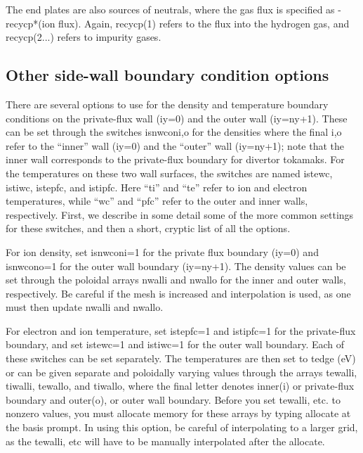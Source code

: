 \documentclass [12pt]{article}
\begin{document}
The end plates are also sources of neutrals, where the gas flux is
specified as -recycp*(ion flux). Again, recycp(1) refers to the flux into
the hydrogen gas, and recycp(2...) refers to impurity gases.


\subsection{Other side-wall boundary condition options}

There are several options to use for the density and temperature boundary
conditions on the private-flux wall (iy=0) and the outer wall (iy=ny+1).
These can be set through the switches {\sf isnwconi,o} for the densities where
the final {\sf i,o} refer to the ``inner'' wall (iy=0) and the ``outer'' wall
(iy=ny+1); note that the inner wall corresponds to the private-flux boundary
for divertor tokamaks.  For the temperatures on these two wall surfaces, the
switches are named {\sf istewc, istiwc, istepfc,} and {\sf istipfc}.  Here
``ti'' and ``te'' refer to ion and electron temperatures, while ``wc'' and
``pfc'' refer to the outer and inner walls, respectively.  First, we describe
in some detail some of the more common settings for these switches, and then a
short, cryptic list of all the options.


For ion density, set isnwconi=1 for the private flux boundary (iy=0) and
isnwcono=1 for the outer wall boundary (iy=ny+1). The density values can be
set through the poloidal arrays nwalli and nwallo for the inner and outer
walls, respectively. Be careful if the mesh is increased and interpolation is
used, as one must then update nwalli and nwallo.
      
For electron and ion temperature, set istepfc=1 and istipfc=1 for the
private-flux boundary, and set istewc=1 and istiwc=1 for the outer wall
boundary. Each of these switches can be set separately. The temperatures are
then set to tedge (eV) or can be given separate and poloidally varying values
through the arrays tewalli, tiwalli, tewallo, and tiwallo, where the final
letter denotes inner(i) or private-flux boundary and outer(o), or outer wall
boundary. Before you set tewalli, etc. to nonzero values, you must allocate
memory for these arrays by typing allocate at the basis prompt. In using this
option, be careful of interpolating to a larger grid, as the tewalli, etc will
have to be manually interpolated after the allocate.
\end{document}
